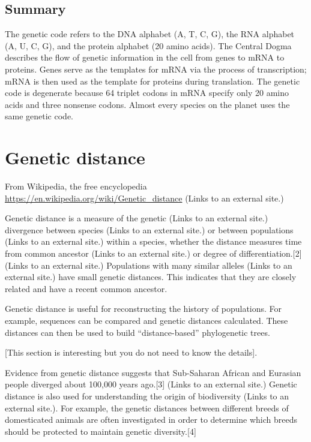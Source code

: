 \documentclass[
]{book}
\begin{document}
\hypertarget{summary}{%
\subsection{Summary}\label{summary}}

The genetic code refers to the DNA alphabet (A, T, C, G), the RNA alphabet (A, U, C, G), and the protein alphabet (20 amino acids). The Central Dogma describes the flow of genetic information in the cell from genes to mRNA to proteins. Genes serve as the templates for mRNA via the process of transcription; mRNA is then used as the template for proteins during translation. The genetic code is degenerate because 64 triplet codons in mRNA specify only 20 amino acids and three nonsense codons. Almost every species on the planet uses the same genetic code.

\hypertarget{genetic-distance}{%
\section{Genetic distance}\label{genetic-distance}}

From Wikipedia, the free encyclopedia
\url{https://en.wikipedia.org/wiki/Genetic_distance} (Links to an external site.)

Genetic distance is a measure of the genetic (Links to an external site.) divergence between species (Links to an external site.) or between populations (Links to an external site.) within a species, whether the distance measures time from common ancestor (Links to an external site.) or degree of differentiation.{[}2{]} (Links to an external site.) Populations with many similar alleles (Links to an external site.) have small genetic distances. This indicates that they are closely related and have a recent common ancestor.

Genetic distance is useful for reconstructing the history of populations. For example, sequences can be compared and genetic distances calculated. These distances can then be used to build ``distance-based'' phylogenetic trees.

{[}This section is interesting but you do not need to know the details{]}.

Evidence from genetic distance suggests that Sub-Saharan African and Eurasian people diverged about 100,000 years ago.{[}3{]} (Links to an external site.) Genetic distance is also used for understanding the origin of biodiversity (Links to an external site.). For example, the genetic distances between different breeds of domesticated animals are often investigated in order to determine which breeds should be protected to maintain genetic diversity.{[}4{]}
\end{document}
